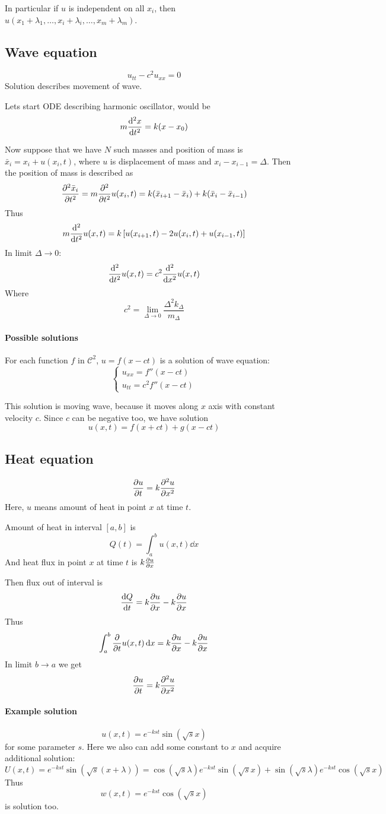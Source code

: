 In particular if $u$ is independent on all $x_i$, then $u(x_1+\lambda_1, \dots, x_i+\lambda_i, \dots, x_m+\lambda_m)$.

\subsection{Wave equation}
$$u_{tt} - c^2 u_{xx} = 0$$
Solution describes movement of wave.

Lets start ODE describing harmonic oscillator, would be
$$m \dv[2]{x}{t} = k(x - x_0)$$

Now suppose that we have $N$ such masses and position of mass is $\bar{x}_i = x_i+u(x_i, t)$, where $u$ is displacement of mass and $x_i - x_{i-1} = \Delta$. Then the position of mass is described as
$$\pdv[2]{\bar{x}_i}{t} = m\pdv[2]{t}u(x_i,t) = k(\bar{x}_{i+1}-\bar{x}_i)+k(\bar{x}_{i}-\bar{x}_{i-1})$$
Thus
$$m\dv[2]{t}u(x,t) = k \left[ u(x_{i+1},t) - 2u(x_i,t) + u(x_{i-1},t) \right]$$
In limit $\Delta \to 0$:
$$\dv[2]{t}u(x,t) = c^2\dv[2]{x}u(x,t)$$
Where
$$c^2 = \lim_{\Delta \to 0} \frac{\Delta^2 k_\Delta}{m_\Delta} $$
\paragraph{Possible solutions}
For each function $f$ in $\mathcal{C}^2$, $u=f(x-ct)$ is a solution of wave equation:
$$\begin{cases}
u_{xx} = f''(x-ct)\\
u_{tt} = c^2 f''(x-ct)
\end{cases}$$

This solution is moving wave, because it moves along $x$ axis with constant velocity $c$. Since $c$ can be negative too, we have solution
$$u(x,t) = f(x+ct) + g(x-ct)$$
\subsection{Heat equation}
$$\pdv{u}{t} = k \pdv[2]{u}{x} $$
Here, $u$ means amount of heat in point $x$ at time $t$.

Amount of heat in interval $[a,b]$ is
$$Q(t) = \int_a^b u(x,t) \dd{x}$$
And heat flux in point $x$ at time $t$ is $k\pdv{u}{x}$

Then flux out of interval is
$$\dv{Q}{t} = k\pdv{u}{x}(b,t) - k\pdv{u}{x}(a,t)$$
Thus
$$\int_a^b \pdv{t}u(x,t) \dd{x}  = k\pdv{u}{x}(b,t) - k\pdv{u}{x}(a,t)$$
In limit $b\to a$ we get
$$\pdv{u}{t} = k \pdv[2]{u}{x} $$

\paragraph{Example solution}
$$u(x,t) = e^{-kst} \sin (\sqrt{s} x)$$
for some parameter $s$. Here we also can add some constant to $x$ and acquire additional solution:
$$U(x,t) = e^{-kst} \sin (\sqrt{s} (x+\lambda)) = \cos (\sqrt{s} \lambda ) e^{-kst} \sin (\sqrt{s} x) +  \sin (\sqrt{s} \lambda ) e^{-kst} \cos (\sqrt{s} x)$$
Thus
$$w(x,t) =  e^{-kst} \cos (\sqrt{s} x)$$
is solution too.

